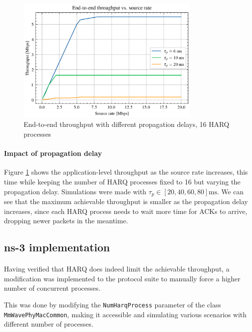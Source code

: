 \begin{figure}[ht]
    \centering
    \includegraphics[width=0.8\textwidth]{res/thr_different_tp.png}
    \caption{End-to-end throughput with different propagation delays, 16 \ac{HARQ} processes}
    \label{fig:thr-different-tp}
\end{figure}
\paragraph{Impact of propagation delay}
Figure \ref{fig:thr-different-tp} shows the application-level throughput as the source rate increases, this time while keeping the number of \ac{HARQ} processes fixed to 16 but varying the propagation delay. Simulations were made with $\tau_p\in[20, 40, 60, 80] \text{ms}$. We can see that the maximum achievable throughput is smaller as the propagation delay increases, since each \ac{HARQ} process needs to wait more time for \ac{ACK}s to arrive, dropping newer packets in the meantime.



\subsection{ns-3 implementation}
\paragraph{}
Having verified that \ac{HARQ} does indeed limit the achievable throughput, a modification was implemented to the protocol suite to manually force a higher number of concurrent processes.

This was done by modifying the \texttt{NumHarqProcess} parameter of the class \texttt{MmWavePhyMacCommon}, making it accessible and simulating various scenarios with different number of processes.

